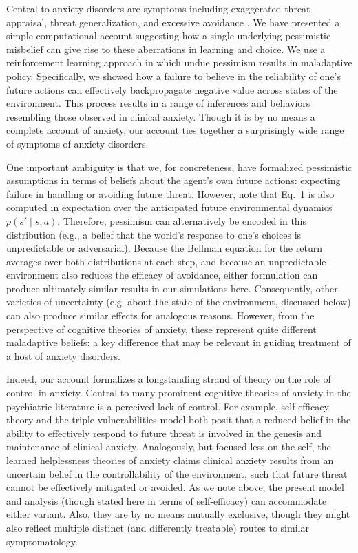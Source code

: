 \documentclass[11pt]{article} %
\begin{document}
Central to anxiety disorders are symptoms including exaggerated threat appraisal, threat generalization, and excessive avoidance \citep{ClarkBeck2011, dymond2015, Arnaudova2017}. We have presented a simple computational account suggesting how a single underlying pessimistic misbelief can give rise to these aberrations in learning and choice. We use a reinforcement learning approach in which undue pessimism results in maladaptive policy. Specifically, we showed how a failure to believe in the reliability of one's future actions can effectively backpropagate negative value across states of the environment. This process results in a range of inferences and behaviors resembling those observed in clinical anxiety. Though it is by no means a complete account of anxiety, our account ties together a surprisingly wide range of symptoms of anxiety disorders.

One important ambiguity is that we, for concreteness, have formalized pessimistic assumptions in terms of beliefs about the agent's own future actions: expecting failure in handling or avoiding future threat. However, note that Eq.~1 is also computed in expectation over the anticipated future environmental dynamics $p(s' \mid s,a)$. Therefore, pessimism can alternatively be encoded in this distribution (e.g., a belief that the world's response to one's choices is unpredictable or adversarial). Because the Bellman equation for the return averages over both distributions at each step, and because an unpredictable environment also reduces the efficacy of avoidance, either formulation can produce ultimately similar results in our simulations here. Consequently, other varieties of uncertainty (e.g. about the state of the environment, discussed below) can also produce similar effects for analogous reasons. However, from the perspective of cognitive theories of anxiety, these represent quite different maladaptive beliefs: a key difference that may be relevant in guiding treatment of a host of anxiety disorders.

Indeed, our account formalizes a longstanding strand of theory on the role of control in anxiety. Central to many prominent cognitive theories of anxiety in the psychiatric literature is a perceived lack of control. For example, self-efficacy theory \citep{bandura1977} and the triple vulnerabilities model \citep{barlow2002} both posit that a reduced belief in the ability to effectively respond to future threat is involved in the genesis and maintenance of clinical anxiety. Analogously, but focused less on the self, the learned helplessness theories of anxiety \cite{alloy1990} claims clinical anxiety results from an uncertain belief in the controllability of the environment, such that future threat cannot be effectively mitigated or avoided. As we note above, the present model and analysis (though stated here in terms of self-efficacy) can accommodate either variant. Also, they are by no means mutually exclusive, though they might also reflect multiple distinct (and differently treatable) routes to similar symptomatology.
\end{document}
